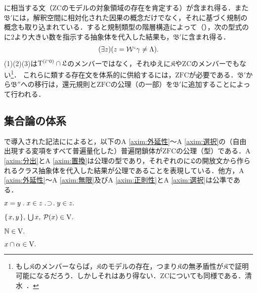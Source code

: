 に相当する文（$\mathrm{ZC}$のモデルの対象領域の存在を肯定する）が含まれ得る．また$\mathfrak{B}'$には，解釈空間に相対化された因果の概念だけでなく，それに基づく規制の概念も取り込まれている．すると規制類型の階層構造によって（），次の型式の\kagi{$ \gamma $}に$2$より大きい数を指示する抽象体を代入した結果も，$\mathfrak{B}'$に含まれ得る．
\begin{align}
    (\exists z)(z = \mathcal{W}{\mspace{1mu}{`}\mspace{1mu}} \gamma\neq\Lambda).
\end{align}
(1)(2)(3)は$\mathrm{T}^{(\breve{\epsilon}{\mspace{1mu}{`}\mspace{1mu}} 0)}\cap\mathfrak{L}$のメンバーではなく，それゆえに$\mathfrak{K}$や$\mathrm{ZC}$のメンバーでもない\footnote{
    もし$\mathfrak{K}$のメンバーならば，$\mathfrak{K}$のモデルの存在，つまり$\mathfrak{K}$の無矛盾性が$\mathfrak{K}$で証明可能になるだろう．しかしそれはあり得ない．$\mathrm{ZC}$についても同様である．清水~\cite[p.\,131,169]{清水}．
}．
これらに類する存在文を体系的に供給するには，$\mathrm{ZFC}$が必要である．$\mathfrak{B}'$から$\mathfrak{B}''$への移行は，還元規則と$\mathrm{ZFC}$の公理（の一部）を$\mathfrak{B}'$に追加することによって行われる．

\subsection{集合論の体系}
\label{ssec:集合論の体系}

で導入された記法にによると，以下のA \ref{axim:外延性}〜A \ref{axim:選択}の（自由出現する変項をすべて普遍量化した）普遍閉鎖体が$\mathrm{ZFC}$の公理（型）である．A \ref{axim:分出}とA \ref{axim:置換}は公理の型であり，それぞれの\kagi{$ \alpha $}に$\mathfrak{L}$の開放文から作られるクラス抽象体を代入した結果が公理であることを表現している．他方，A \ref{axim:外延性}〜A \ref{axim:無限}及びA \ref{axim:正則性}とA \ref{axim:選択}は公準である．

\begin{axim}[外延性]
\label{axim:外延性}
$
    x=y\con{1}x\in z\case{1}{1}{1}y\in z.
$
\end{axim}

\begin{axim}[一対化，和，冪]
\label{axim:一対化，和，冪}
$
    \{\mspace{2mu}x,y\mspace{2mu}\},\:{\textstyle\bigcup}\mspace{3mu}x,\:\mathcal{P}(x)\in\mathrm{V}.
$
\end{axim}

\begin{axim}[無限]
\label{axim:無限}
$
    \mathbb{N}\in\mathrm{V}.
$
\end{axim}

\begin{axim}[分出]
\label{axim:分出}
$
    x\cap\alpha\in\mathrm{V}.
$
\end{axim}

